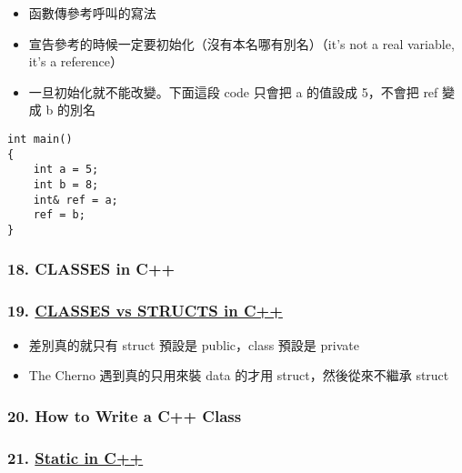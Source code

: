 \documentclass[11pt]{article}
\providecommand{\tightlist}{%
      \setlength{\itemsep}{0pt}\setlength{\parskip}{0pt}}
\begin{document}
\begin{itemize}
\tightlist
\item
  函數傳參考呼叫的寫法
\item
  宣告參考的時候一定要初始化（沒有本名哪有別名）（it's not a real
  variable, it's a reference）
\item
  一旦初始化就不能改變。下面這段 code 只會把 a 的值設成 5，不會把 ref
  變成 b 的別名
\end{itemize}

\begin{verbatim}
int main()
{
    int a = 5;
    int b = 8;
    int& ref = a;
    ref = b;
}
\end{verbatim}

\hypertarget{classes-in-c}{%
\subsubsection{18. CLASSES in C++}\label{classes-in-c}}

\hypertarget{classes-vs-structs-in-c}{%
\subsubsection{\texorpdfstring{19.
\href{https://www.youtube.com/watch?v=fLgTtaqqJp0\&list=PLlrATfBNZ98dudnM48yfGUldqGD0S4FFb\&index=19}{CLASSES
vs STRUCTS in
C++}}{19. CLASSES vs STRUCTS in C++}}\label{classes-vs-structs-in-c}}

\begin{itemize}
\tightlist
\item
  差別真的就只有 struct 預設是 public，class 預設是 private
\item
  The Cherno 遇到真的只用來裝 data 的才用 struct，然後從來不繼承 struct
\end{itemize}

\hypertarget{how-to-write-a-c-class}{%
\subsubsection{20. How to Write a C++
Class}\label{how-to-write-a-c-class}}

\hypertarget{static-in-c}{%
\subsubsection{\texorpdfstring{21.
\href{https://www.youtube.com/watch?v=f3FVU-iwNuA\&list=PLlrATfBNZ98dudnM48yfGUldqGD0S4FFb\&index=22\&t=0s}{Static
in C++}}{21. Static in C++}}\label{static-in-c}}
\end{document}

